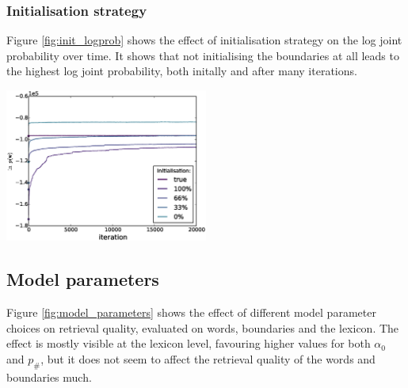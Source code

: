 \subsubsection{Initialisation strategy}

Figure \ref{fig:init_logprob} shows the effect of initialisation strategy on the log joint probability over time. It shows that not initialising the boundaries at all leads to the highest log joint probability, both initally and after many iterations.

\begingroup
    \centering
    \includegraphics[width=0.5\textwidth]{images/initialisation-log_prob}
    \label{fig:init_logprob}
\endgroup

\subsection{Model parameters}

Figure \ref{fig:model_parameters} shows the effect of different model parameter choices on retrieval quality, evaluated on words, boundaries and the lexicon. The effect is mostly visible at the lexicon level, favouring higher values for both $\alpha_0$ and $p_\#$, but it does not seem to affect the retrieval quality of the words and boundaries much.

